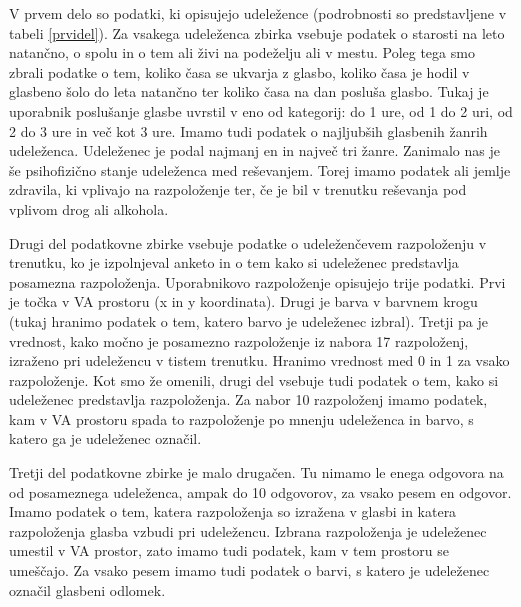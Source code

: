 \documentclass[a4paper, 12pt]{book}
\begin{document}
{V prvem delo so podatki, ki opisujejo udeležence (podrobnosti so predstavljene v tabeli \ref{prvidel}). Za vsakega udeleženca zbirka vsebuje podatek o starosti na leto natančno, o spolu in o tem ali živi na podeželju ali v mestu. Poleg tega smo zbrali podatke o tem, koliko časa se ukvarja z glasbo, koliko časa je hodil v glasbeno šolo do leta natančno ter koliko časa na dan posluša glasbo. Tukaj je uporabnik poslušanje glasbe uvrstil v eno od kategorij: do 1 ure, od 1 do 2 uri, od 2 do 3 ure in več kot 3 ure. Imamo tudi podatek o najljubših glasbenih žanrih udeleženca. Udeleženec je podal najmanj en in največ tri žanre. Zanimalo nas je še psihofizično stanje udeleženca med reševanjem. Torej imamo podatek ali jemlje zdravila, ki vplivajo na razpoloženje ter, če je bil v trenutku reševanja pod vplivom drog ali alkohola. 

Drugi del podatkovne zbirke vsebuje podatke o udeleženčevem razpoloženju v trenutku, ko je izpolnjeval anketo in o tem kako si udeleženec predstavlja posamezna razpoloženja. Uporabnikovo razpoloženje opisujejo trije podatki. Prvi je točka v VA prostoru (x in y koordinata). Drugi je barva v barvnem krogu (tukaj hranimo podatek o tem, katero barvo je  udeleženec izbral). Tretji pa je vrednost, kako močno je posamezno razpoloženje iz nabora 17 razpoloženj, izraženo pri udeležencu v tistem trenutku. Hranimo vrednost med 0 in 1 za vsako razpoloženje. Kot smo že omenili, drugi del vsebuje tudi podatek o tem, kako si udeleženec predstavlja razpoloženja. Za nabor 10 razpoloženj imamo podatek, kam v VA prostoru spada to razpoloženje po mnenju udeleženca in barvo, s katero ga je udeleženec označil. 

Tretji del podatkovne zbirke je malo drugačen. Tu nimamo le enega odgovora na od posameznega udeleženca, ampak do 10 odgovorov, za vsako pesem en odgovor. Imamo podatek o tem, katera razpoloženja so izražena v glasbi in katera razpoloženja glasba vzbudi pri udeležencu. Izbrana razpoloženja je udeleženec umestil v VA prostor, zato imamo tudi podatek, kam v tem prostoru se umeščajo.  Za vsako pesem imamo tudi podatek o barvi, s katero je udeleženec označil glasbeni odlomek.  



}
\end{document}
